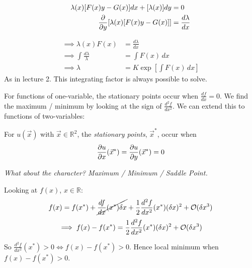 \documentclass[10pt]{scrartcl}
\begin{document}
\[
\begin{aligned}
  \lambda(x)[F(x)y - G(x)]dx + [\lambda(x)]dy &=0\\
  \frac{\del}{\del y}[\lambda(x)[F(x)y-G(x)]] &= \frac{d\lambda}{dx}
\end{aligned}
\]

\[
\begin{aligned}
  \implies \lambda(x)F(x) &= \frac{d\lambda}{dx}\\
  \implies \int \frac{d\lambda}{\lambda} &= \int F(x)\,dx\\
  \implies \lambda &= K\exp\left[\int F(x)\,dx\right]
\end{aligned}
\]
As in lecture 2. This integrating factor is always possible to solve. 






\vspace*{5pt} %

For functions of one-variable, the stationary points occur when $\frac{df}{dx} = 0$. We find the maximum / minimum by looking at the sign of $\frac{d^2f}{dx^2}$. We can extend this to functions of two-variables:\\


\begin{definition}
For $u(\vec{x})$ with $\vec{x} \in \mathbb{R}^2$, the \emph{stationary points}, $\vec{x}^*$, occur when
\[\frac{\del u}{\del x}(\vec{x}^*) = \frac{\del u}{\del y}(\vec{x}^*) = 0\]
\end{definition}

\textit{What about the character? Maximum / Minimum / Saddle Point.}~\\

\begin{example}Looking at $f(x)$, $x \in \mathbb{R}$:
\[f(x) = f(x^*) + \cancel{\frac{df}{dx}(x^*)\delta x} + \frac{1}{2} \frac{d^2f}{dx^2}(x^*)(\delta x)^2 + \cal{O}(\delta x^3)\]
\[\implies f(x) - f(x^*) = \frac{1}{2} \frac{d^2f}{dx^2}(x^*)(\delta x)^2 + \cal{O}(\delta x^3)\]

So  $\frac{d^2f}{dx^2}(x^*) > 0 \iff f(x) - f(x^*) > 0$. Hence local minimum when $f(x) -f(x^*) > 0$.
\end{example}~
\end{document}
